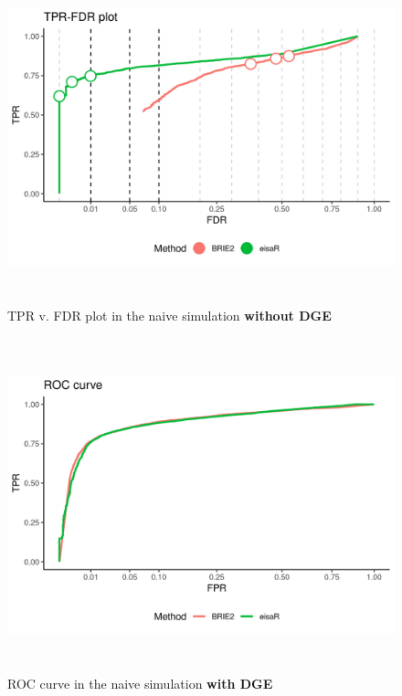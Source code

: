 \begin{figure}[!htb]
\begin{center}
\includegraphics[width=6in,height=3.8in]{../figures/simulation/naive_simulation_FDR.png}
\end{center}
\caption{TPR v. FDR plot in the naive simulation \textbf{without DGE}}
\label{fig:naive_sim_FDR}
\end{figure}

\begin{figure}[!htb]
\begin{center}
\includegraphics[width=6in,height=3.8in]{../figures/simulation/naive_simulation_DGE_ROC.png}
\end{center}
\caption{ROC curve in the naive simulation \textbf{with DGE}}
\label{fig:naive_sim_DGE_ROC}
\end{figure}

